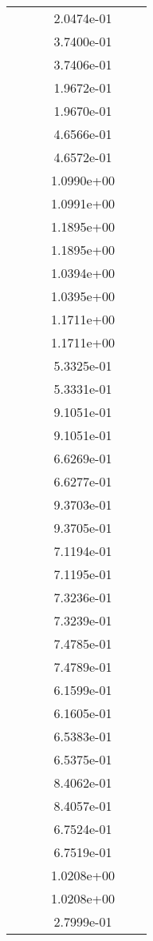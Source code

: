 \begin{xltabular}{\textwidth}{r|rS[table-format=1.3e+2]S[table-format=1.4e+2]S[table-format=1.4e+2]S[table-format=-1.5]}
&  &  & 2.0474e-01 & & \\
&  &  & 3.7400e-01 & & \\
&  &  & 3.7406e-01 & & \\
&  &  & 1.9672e-01 & & \\
&  &  & 1.9670e-01 & & \\
&  &  & 4.6566e-01 & & \\
&  &  & 4.6572e-01 & & \\
&  &  & 1.0990e+00 & & \\
&  &  & 1.0991e+00 & & \\
&  &  & 1.1895e+00 & & \\
&  &  & 1.1895e+00 & & \\
&  &  & 1.0394e+00 & & \\
&  &  & 1.0395e+00 & & \\
&  &  & 1.1711e+00 & & \\
&  &  & 1.1711e+00 & & \\
&  &  & 5.3325e-01 & & \\
&  &  & 5.3331e-01 & & \\
&  &  & 9.1051e-01 & & \\
&  &  & 9.1051e-01 & & \\
&  &  & 6.6269e-01 & & \\
&  &  & 6.6277e-01 & & \\
&  &  & 9.3703e-01 & & \\
&  &  & 9.3705e-01 & & \\
&  &  & 7.1194e-01 & & \\
&  &  & 7.1195e-01 & & \\
&  &  & 7.3236e-01 & & \\
&  &  & 7.3239e-01 & & \\
&  &  & 7.4785e-01 & & \\
&  &  & 7.4789e-01 & & \\
&  &  & 6.1599e-01 & & \\
&  &  & 6.1605e-01 & & \\
&  &  & 6.5383e-01 & & \\
&  &  & 6.5375e-01 & & \\
&  &  & 8.4062e-01 & & \\
&  &  & 8.4057e-01 & & \\
&  &  & 6.7524e-01 & & \\
&  &  & 6.7519e-01 & & \\
&  &  & 1.0208e+00 & & \\
&  &  & 1.0208e+00 & & \\
&  &  & 2.7999e-01 & & \\

\end{xltabular}
